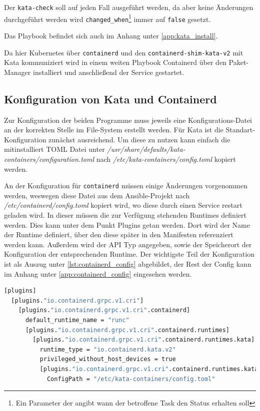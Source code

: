 Der \texttt{kata-check} soll auf jeden Fall ausgeführt werden, da aber keine Änderungen durchgeführt werden wird \texttt{changed\_when}\footnote{Ein Parameter der angibt wann der betroffene Task den Status  erhalten soll} immer auf \texttt{false} gesetzt.

Das Playbook befindet sich auch im Anhang unter \ref{app:kata_install}.

Da hier Kubernetes über \texttt{containerd} und den \texttt{containerd-shim-kata-v2} mit Kata kommuniziert wird in einem weiten Playbook Containerd über den Paket-Manager installiert und anschließend der Service gestartet.


\subsection{Konfiguration von Kata und Containerd}
\label{ref:kata_config}

Zur Konfiguration der beiden Programme muss jeweils eine Konfigurations-Datei an der korrekten Stelle im File-System erstellt werden.
Für Kata ist die Standart-Konfiguration zunächst ausreichend. 
Um diese zu nutzen kann einfach die mitinstalliert \ac{TOML} Datei unter \textit{/usr/share/defaults/kata-containers/configuration.toml} nach \textit{/etc/kata-containers/config.toml} kopiert werden.

An der Konfiguration für \texttt{containerd} müssen einige Änderungen vorgenommen werden, weswegen diese Datei aus dem Ansible-Projekt nach \textit{/etc/containerd/config.toml} kopiert wird, wo diese durch einen Service restart geladen wird.
In dieser müssen die zur Verfügung stehenden Runtimes definiert werden.
Dies kann unter dem Punkt Plugins getan werden.
Dort wird der Name der Runtime definiert, über den diese später in den Manifesten referenziert werden kann.
Außerdem wird der \ac{API} Typ angegeben, sowie der Speicherort der Konfiguration der entsprechenden Runtime.
Der wichtigste Teil der Konfiguration ist als Auszug unter \ref{lst:containerd_config} abgebildet, der Rest der Config kann im Anhang unter \ref{app:containerd_config} eingesehen werden.

\begin{lstlisting}[language=bash, caption={/etc/contaienrd/config.toml}, label={lst:containerd_config}]
[plugins]
  [plugins."io.containerd.grpc.v1.cri"]
    [plugins."io.containerd.grpc.v1.cri".containerd]
      default_runtime_name = "runc"
      [plugins."io.containerd.grpc.v1.cri".containerd.runtimes]
        [plugins."io.containerd.grpc.v1.cri".containerd.runtimes.kata]
          runtime_type = "io.containerd.kata.v2"
          privileged_without_host_devices = true
          [plugins."io.containerd.grpc.v1.cri".containerd.runtimes.kata.options]
            ConfigPath = "/etc/kata-containers/config.toml"
\end{lstlisting}

